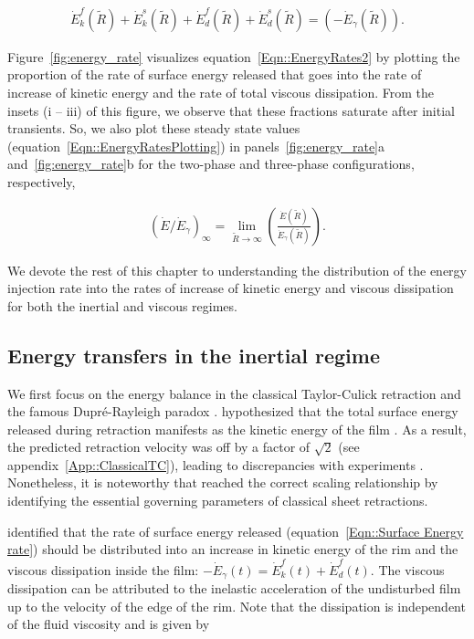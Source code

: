 \begin{align}
	\label{Eqn::EnergyRates2}
	\dot{E}_k^f(\tilde{R}) + \dot{E}_k^s(\tilde{R}) + \dot{E}_d^f(\tilde{R}) + \dot{E}_d^s(\tilde{R}) = \left(-\dot{E}_\gamma(\tilde{R})\right).
\end{align}

Figure~\ref{fig:energy_rate} visualizes equation~\eqref{Eqn::EnergyRates2} by plotting the proportion of the rate of surface energy released that goes into the rate of increase of kinetic energy and the rate of total viscous dissipation. From the insets (i -- iii) of this figure, we observe that these fractions saturate after initial transients. So, we also plot these steady state values (equation~\eqref{Eqn::EnergyRatesPlotting}) in panels~\ref{fig:energy_rate}a and~\ref{fig:energy_rate}b for the two-phase and three-phase configurations, respectively, 

\begin{align}
	\left(\dot{E}/\dot{E}_{\gamma}\right)_\infty = \lim\limits_{\tilde{R} \to \infty}\left(\frac{\dot{E}(\tilde{R})}{\dot{E}_{\gamma}(\tilde{R})}\right).
	\label{Eqn::EnergyRatesPlotting}
\end{align}

We devote the rest of this chapter to understanding the distribution of the energy injection rate into the rates of increase of kinetic energy and viscous dissipation for both the inertial and viscous regimes. 

\subsection{Energy transfers in the inertial regime}\label{sec:energetics inertial}
We first focus on the energy balance in the classical Taylor-Culick retraction and the famous  Dupr{\'e}-Rayleigh paradox \citep{villermaux2020fragmentation}. \citet{dupre1867theorie, dupre1869theorie} hypothesized that the total surface energy released during retraction manifests as the kinetic energy of the film \citep{rayleigh-1891-nature}. As a result, the predicted retraction velocity was off by a factor of $\sqrt{2}$ (see appendix~\ref{App::ClassicalTC}), leading to discrepancies with experiments \citep{ranz-1959-japplphys, culick-1960-japplphys}. Nonetheless, it is noteworthy that \citet{dupre1867theorie, dupre1869theorie} reached the correct scaling relationship by identifying the essential governing parameters of classical sheet retractions. 

\citet{culick-1960-japplphys} identified that the rate of surface energy released (equation~\eqref{Eqn::Surface Energy rate}) should be distributed into an increase in kinetic energy of the rim and the viscous dissipation inside the film: $-\dot{E}_\gamma(t) = \dot{E}_k^f(t) + \dot{E}_d^f(t)$. The viscous dissipation can be attributed to the inelastic acceleration of the undisturbed film up to the velocity of the edge of the rim. Note that the dissipation is independent of the fluid viscosity and is given by \citep{culick-1960-japplphys}

